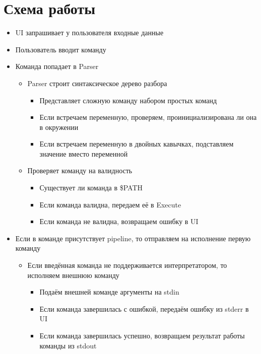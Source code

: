 \documentclass[a4paper,10pt]{article}
\begin{document}
\newpage

\section*{Схема работы}

\begin{itemize}
	\item UI запрашивает у пользователя входные данные
	\item Пользователь вводит команду
	\item Команда попадает в Parser
	      \begin{itemize}
		      \item Parser строит синтаксическое дерево разбора
		            \begin{itemize}
			            \item Представляет сложную команду набором простых команд
			            \item Если встречаем переменную, проверяем, проинициализирована ли она в окружении
			            \item Если встречаем переменную в двойных кавычках, подставляем значение вместо переменной
		            \end{itemize}
		      \item Проверяет команду на валидность
		            \begin{itemize}
			            \item Существует ли команда в \$PATH
			            \item Если команда валидна, передаем её в Execute
			            \item Если команда не валидна, возвращаем ошибку в UI
		            \end{itemize}
	      \end{itemize}
	\item Если в команде присутствует pipeline, то отправляем на исполнение первую команду
	      \begin{itemize}
		      \item Если введённая команда не поддерживается интерпретатором, то исполняем внешнюю команду
		            \begin{itemize}
			            \item Подаём внешней команде аргументы на stdin
			            \item Если команда завершилась с ошибкой, передаём ошибку из stderr в UI
			            \item Если команда завершилась успешно, возвращаем результат работы команды из stdout

\end{itemize}
\end{itemize}
\end{itemize}
\end{document}
